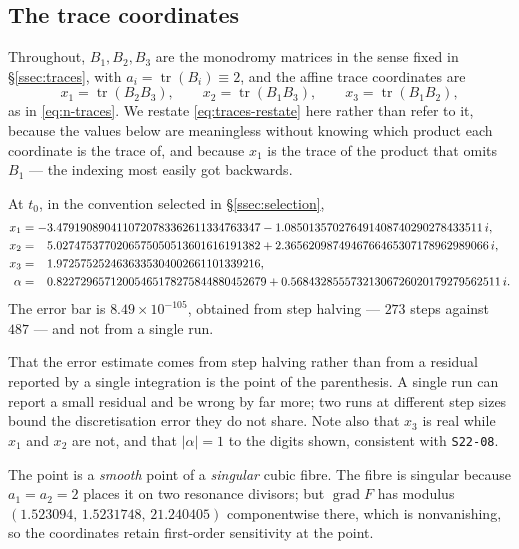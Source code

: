 \subsection{The trace coordinates}\label{ssec:traces-value}

Throughout, $B_1,B_2,B_3$ are the monodromy matrices in the sense fixed in
\S\ref{ssec:traces}, with $a_i=\operatorname{tr}(B_i)\equiv 2$, and the affine
trace coordinates are
\begin{equation}\label{eq:traces-restate}
x_1=\operatorname{tr}(B_2B_3),\qquad
x_2=\operatorname{tr}(B_1B_3),\qquad
x_3=\operatorname{tr}(B_1B_2),
\end{equation}
as in \eqref{eq:n-traces}. We restate \eqref{eq:traces-restate} here rather
than refer to it, because the values below are meaningless without knowing
which product each coordinate is the trace of, and because $x_1$ is the trace
of the product that omits $B_1$ --- the indexing most easily got backwards.

\begin{remark}
At $t_0$, in the convention selected in \S\ref{ssec:selection},
\begin{align*}
x_1&=-3.4791908904110720783362611334763347
 -1.085013570276491408740290278433511\,i,\\
x_2&=\hphantom{-}5.0274753770206575050513601616191382
 +2.3656209874946766465307178962989066\,i,\\
x_3&=\hphantom{-}1.9725752524636335304002661101339216,\\
\alpha&=\hphantom{-}0.82272965712005465178275844880452679
 +0.56843285557321306726020179279562511\,i.
\end{align*}
The error bar is $8.49\times10^{-105}$, obtained from step halving --- $273$
steps against $487$ --- and not from a single
run.
\end{remark}

That the error estimate comes from step halving rather than from a residual
reported by a single integration is the point of the parenthesis. A single run
can report a small residual and be wrong by far more; two runs at different
step sizes bound the discretisation error they do not share. Note also that
$x_3$ is real while $x_1$ and $x_2$ are not, and that
$|\alpha|=1$ to the digits shown, consistent with \texttt{S22-08}.

\begin{remark}
The point is a \emph{smooth} point of a \emph{singular} cubic fibre. The fibre
is singular because $a_1=a_2=2$ places it on two resonance divisors; but
$\operatorname{grad}F$ has modulus $(1.523094,\,1.5231748,\,21.240405)$
componentwise there, which is nonvanishing, so the coordinates retain
first-order sensitivity at the point.
\end{remark}

